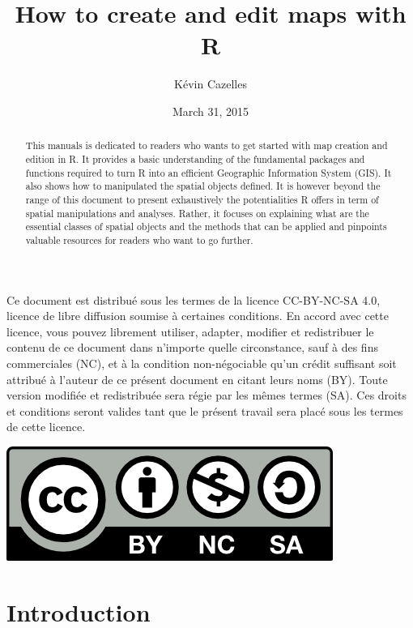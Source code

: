 \documentclass[]{report}
\title{How to create and edit maps with R}
\author{Kévin Cazelles}
\date{March 31, 2015}
\begin{document}
\maketitle
\begin{abstract}
This manuals is dedicated to readers who wants to get started with map
creation and edition in R. It provides a basic understanding of the
fundamental packages and functions required to turn R into an efficient
Geographic Information System (GIS). It also shows how to manipulated
the spatial objects defined. It is however beyond the range of this
document to present exhaustively the potentialities R offers in term of
spatial manipulations and analyses. Rather, it focuses on explaining
what are the essential classes of spatial objects and the methods that
can be applied and pinpoints valuable resources for readers who want to
go further.
\end{abstract}


Ce document est distribu\'{e} sous les termes de la licence CC-BY-NC-SA 4.0, licence de libre diffusion soumise à certaines conditions. En accord avec cette licence, vous pouvez librement utiliser, adapter, modifier et redistribuer le contenu de ce document dans n'importe quelle circonstance, sauf à des fins commerciales (NC), et à la condition non-n\'{e}gociable qu’un cr\'{e}dit suffisant soit attribu\'{e} à l'auteur de ce pr\'{e}sent document en citant leurs noms (BY). Toute version modifi\'{e}e et redistribu\'{e}e sera r\'{e}gie par les m\^{e}mes termes (SA). Ces droits et conditions seront valides tant que le pr\'{e}sent travail sera plac\'{e} sous les termes de cette licence.

\begin{center}
\includegraphics[width=.28\textwidth]{aux/ccbyncsa.png}
\end{center}


\newpage

{
\setcounter{tocdepth}{2}
\tableofcontents
}
\listoffigures
\chapter{Introduction}\label{introduction}
\end{document}
